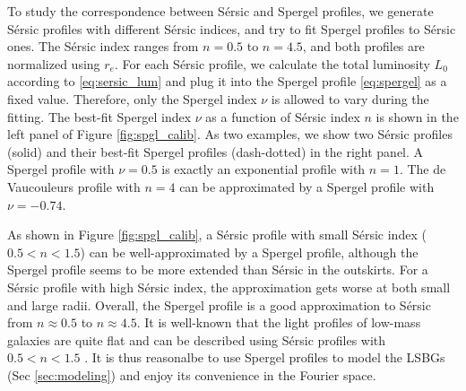 \documentclass[twocolumn,astrosymb,twocolappendix]{aastex631}
\newcommand{\sersic}{S\'ersic}
\begin{document}
\begin{CJK*}{UTF8}{gbsn}
To study the correspondence between \sersic{} and Spergel profiles, we generate \sersic{} profiles with different \sersic{} indices, and try to fit Spergel profiles to \sersic{} ones. The \sersic{} index ranges from $n=0.5$ to $n=4.5$, and both profiles are normalized using $r_e$. For each \sersic{} profile, we calculate the total luminosity $L_0$ according to \eqref{eq:sersic_lum} and plug it into the Spergel profile \eqref{eq:spergel} as a fixed value. Therefore, only the Spergel index $\nu$ is allowed to vary during the fitting. The best-fit Spergel index $\nu$ as a function of \sersic{} index $n$ is shown in the left panel of Figure \ref{fig:spgl_calib}. As two examples, we show two \sersic{} profiles (solid) and their best-fit Spergel profiles (dash-dotted) in the right panel. A Spergel profile with $\nu=0.5$ is exactly an exponential profile with $n=1$. The de Vaucouleurs profile \citep{deVaucouleurs1948} with $n=4$ can be approximated by a Spergel profile with $\nu=-0.74$. 

As shown in Figure \ref{fig:spgl_calib}, a \sersic{} profile with small \sersic{} index ($0.5 < n < 1.5$) can be well-approximated by a Spergel profile, although the Spergel profile seems to be more extended than \sersic{} in the outskirts. For a \sersic{} profile with high \sersic{} index, the approximation gets worse at both small and large radii. Overall, the Spergel profile is a good approximation to \sersic{} from $n\approx 0.5$ to $n\approx 4.5$. It is well-known that the light profiles of low-mass galaxies are quite flat and can be described using \sersic{} profiles with $0.5 < n < 1.5$ \citep[e.g.,][]{vanDokkum2015,Lange2015,Greco2018,Zaritsky2021,ELVES-I}. It is thus reasonalbe to use Spergel profiles to model the LSBGs (Sec \ref{sec:modeling}) and enjoy its convenience in the Fourier space. 






\end{CJK*}
\end{document}
